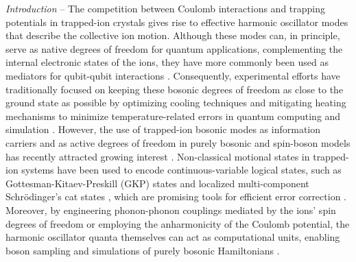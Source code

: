 \documentclass[%
reprint,
superscriptaddress,
amsmath,amssymb,
aps,
prl,
floatfix,
]{revtex4-2}
\begin{document}
\maketitle

\emph{Introduction} -- The competition between Coulomb interactions and trapping potentials in trapped-ion crystals gives rise to effective harmonic oscillator modes that describe the collective ion motion. Although these modes can, in principle, serve as native degrees of freedom for quantum applications, complementing the internal electronic states of the ions, they have more commonly been used as mediators for qubit-qubit interactions \cite{monroe2021programmable}. Consequently, experimental efforts have traditionally focused on keeping these bosonic degrees of freedom as close to the ground state as possible by optimizing cooling techniques and mitigating heating mechanisms to minimize temperature-related errors in quantum computing and simulation \cite{wineland1997issue,myatt2000decoherence,brownnutt2015noise}. However, the use of trapped-ion bosonic modes as information carriers and as active degrees of freedom in purely bosonic and spin-boson models has recently attracted growing interest \cite{chen2021bosonic,pagano2025varenna}. Non-classical motional states in trapped-ion systems have been used to encode continuous-variable logical states, such as Gottesman-Kitaev-Preskill (GKP) states \cite{fluhmann2019encoding,matsos2024gkp} and localized multi-component Schrödinger’s cat states \cite{rojkov2024stabilizationcatstatemanifoldsusing}, which are promising tools for efficient error correction \cite{gkp2001original,michael2016ecc,grimsmo2020bosoniccode}. Moreover, by engineering phonon-phonon couplings mediated by the ions’ spin degrees of freedom or employing the anharmonicity of the Coulomb potential, the harmonic oscillator quanta themselves can act as computational units, enabling boson sampling and simulations of purely bosonic Hamiltonians \cite{toyoda2015hom,debnath2018boson,zhang2018NOON,ding2018trilinear,katz2023boson,hou2024modulate}.
\end{document}
